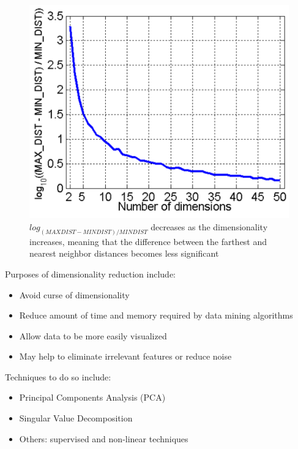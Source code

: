    \begin{figure}[htbp]
      \centering
      \includegraphics{images/01/dimensionalitycurse.png}
      \caption{$log_{(MAXDIST-MINDIST)/MINDIST}$ decreases as the dimensionality increases, meaning that the difference between the farthest and nearest neighbor distances becomes less significant}
      \label{fig:01/dimensionalitycurse}
   \end{figure}


{Purposes of dimensionality reduction include:\ns
\begin{itemize}
	\item Avoid curse of dimensionality
	\item Reduce amount of time and memory required by data
mining algorithms
	\item Allow data to be more easily visualized
	\item May help to eliminate irrelevant features or reduce noise
\end{itemize}}

{Techniques to do so include:\ns
\begin{itemize}
	\item Principal Components Analysis (PCA)
	\item Singular Value Decomposition
	\item Others: supervised and non-linear techniques
\end{itemize}}


